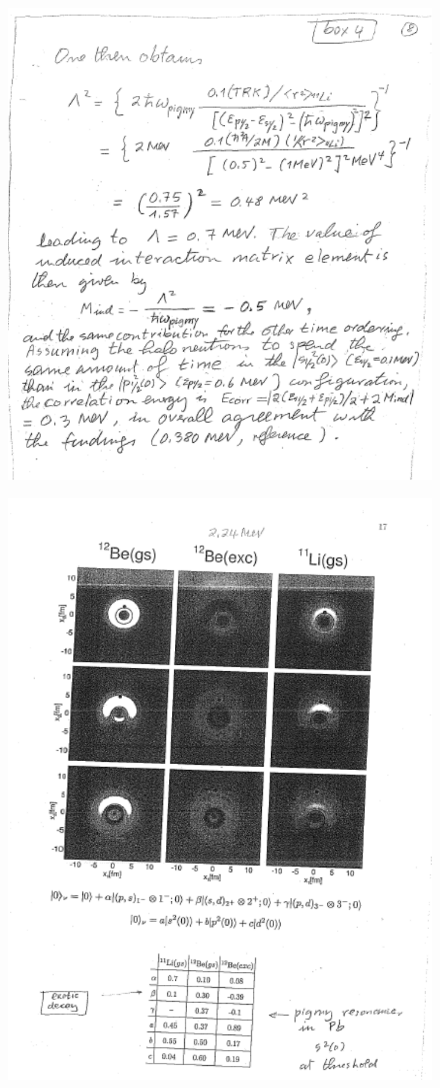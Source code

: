 \documentclass[a4paper,11pt]{book}
\numberwithin{equation}{section}
\numberwithin{figure}{section}
\numberwithin{table}{section}
\begin{document}
\begin{figure}
\centerline{\includegraphics*[width=\textwidth,angle=0]{figs/box4_6.pdf}}
\end{figure}
\begin{figure}
\centerline{\includegraphics*[width=\textwidth,angle=0]{figs/box4_9.pdf}}
\caption{}\label{box4}
\end{figure}






 
 
\end{document}
